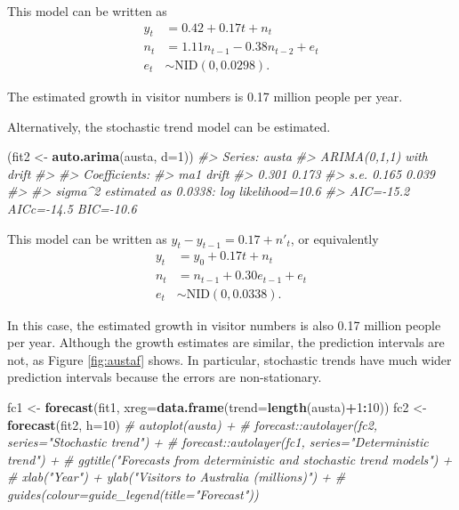 \documentclass[]{book}
\newenvironment{Shaded}{\begin{snugshade}}{\end{snugshade}}
\newcommand{\CommentTok}[1]{\textcolor[rgb]{0.56,0.35,0.01}{\textit{#1}}}
\newcommand{\DataTypeTok}[1]{\textcolor[rgb]{0.13,0.29,0.53}{#1}}
\newcommand{\DecValTok}[1]{\textcolor[rgb]{0.00,0.00,0.81}{#1}}
\newcommand{\KeywordTok}[1]{\textcolor[rgb]{0.13,0.29,0.53}{\textbf{#1}}}
\newcommand{\NormalTok}[1]{#1}
\newcommand{\OperatorTok}[1]{\textcolor[rgb]{0.81,0.36,0.00}{\textbf{#1}}}
\newcommand{\StringTok}[1]{\textcolor[rgb]{0.31,0.60,0.02}{#1}}
\begin{document}
This model can be written as
\begin{align*}
  y_t &= 0.42 + 0.17 t + n_t \\
  n_t &= 1.11 n_{t-1} -0.38 n_{t-2} + e_t\\
  e_t &\sim \text{NID}(0,0.0298).
\end{align*}

The estimated growth in visitor numbers is 0.17 million people per year.

Alternatively, the stochastic trend model can be estimated.

\begin{Shaded}
\begin{Highlighting}[]
\NormalTok{(fit2 <-}\StringTok{ }\KeywordTok{auto.arima}\NormalTok{(austa, }\DataTypeTok{d=}\DecValTok{1}\NormalTok{))}
\CommentTok{#> Series: austa }
\CommentTok{#> ARIMA(0,1,1) with drift }
\CommentTok{#> }
\CommentTok{#> Coefficients:}
\CommentTok{#>         ma1  drift}
\CommentTok{#>       0.301  0.173}
\CommentTok{#> s.e.  0.165  0.039}
\CommentTok{#> }
\CommentTok{#> sigma^2 estimated as 0.0338:  log likelihood=10.6}
\CommentTok{#> AIC=-15.2   AICc=-14.5   BIC=-10.6}
\end{Highlighting}
\end{Shaded}

This model can be written as \(y_t-y_{t-1} = 0.17 + n'_t\), or equivalently
\begin{align*}
  y_t &= y_0 + 0.17 t + n_t \\
  n_t &= n_{t-1} + 0.30 e_{t-1} + e_{t}\\
  e_t &\sim \text{NID}(0,0.0338).
\end{align*}

In this case, the estimated growth in visitor numbers is also 0.17 million people per year. Although the growth estimates are similar, the prediction intervals are not, as Figure \ref{fig:austaf} shows. In particular, stochastic trends have much wider prediction intervals because the errors are non-stationary.

\begin{Shaded}
\begin{Highlighting}[]
\NormalTok{fc1 <-}\StringTok{ }\KeywordTok{forecast}\NormalTok{(fit1, }\DataTypeTok{xreg=}\KeywordTok{data.frame}\NormalTok{(}\DataTypeTok{trend=}\KeywordTok{length}\NormalTok{(austa)}\OperatorTok{+}\DecValTok{1}\OperatorTok{:}\DecValTok{10}\NormalTok{))}
\NormalTok{fc2 <-}\StringTok{ }\KeywordTok{forecast}\NormalTok{(fit2, }\DataTypeTok{h=}\DecValTok{10}\NormalTok{)}
\CommentTok{# autoplot(austa) +}
\CommentTok{#   forecast::autolayer(fc2, series="Stochastic trend") +}
\CommentTok{#   forecast::autolayer(fc1, series="Deterministic trend") +}
\CommentTok{#   ggtitle("Forecasts from deterministic and stochastic trend models") +}
\CommentTok{#   xlab("Year") + ylab("Visitors to Australia (millions)") +}
\CommentTok{#   guides(colour=guide_legend(title="Forecast"))}
\end{Highlighting}
\end{Shaded}
\end{document}
